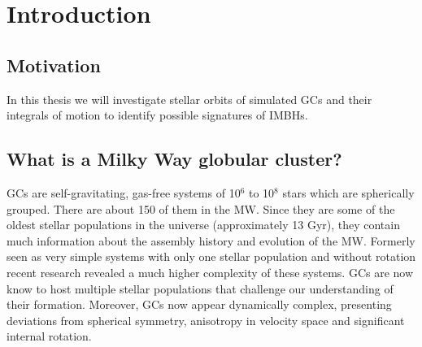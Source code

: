 

\section{Introduction}

\subsection{Motivation}
In this thesis we will investigate stellar orbits of simulated \ac{GCs} and their integrals of motion to identify possible signatures of \ac{IMBHs}. 
\subsection{What is a Milky Way globular cluster?}\label{sec1.2}
\ac{GCs} are self-gravitating, gas-free systems of 10\(^6\) to 10\(^8\) stars which are spherically grouped. There are about 150 of them in the \ac{MW}. Since they are some of the oldest stellar populations in the universe (approximately 13 Gyr), they contain much information about the assembly history and evolution of the \ac{MW}. Formerly seen as very simple systems with only one stellar population and without rotation recent research revealed a much higher complexity of these systems. \ac{GCs} are now know to host multiple stellar populations that challenge our understanding of their formation. Moreover, \ac{GCs} now appear dynamically complex, presenting deviations from spherical symmetry, anisotropy in velocity space and significant internal rotation.
